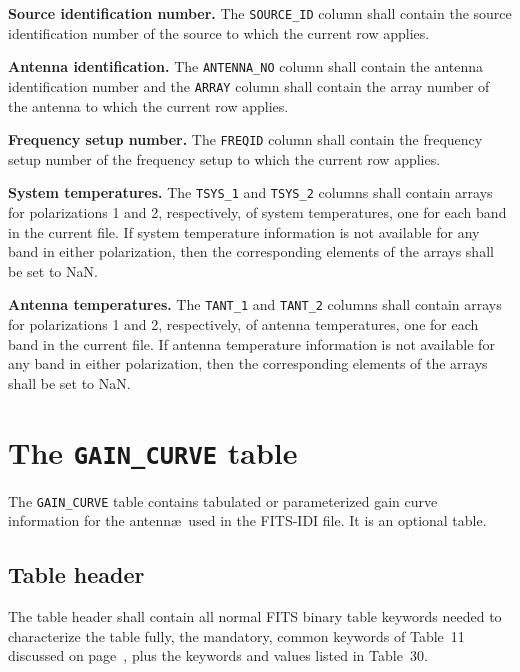 \documentclass[twoside]{article}
\newcommand{\Hi}[1]{\textcolor{hicol}{#1}}
\begin{document}
{\bf Source identification number.}  The {\tt SOURCE\_ID} column shall
contain the source identification number of the source to which the
current \Hi{row} applies.

{\bf Antenna identification.}  The {\tt ANTENNA\_NO} column shall
contain the antenna identification number and the {\tt ARRAY} column
shall contain the array number of the antenna to which the current row
applies.

{\bf Frequency setup number.}  The {\tt FREQID} column shall contain
the frequency setup number of the frequency setup to which the current
\Hi{row} applies.

{\bf System temperatures.}  The {\tt TSYS\_1} and {\tt TSYS\_2}
columns shall contain arrays \Hi{for polarizations 1 and 2,
  respectively,} of system temperatures\Hi{, one for each band in the
  current file.}  If system temperature information is not available
for any band in either polarization, then the corresponding elements
of the arrays shall be set to NaN\@.

{\bf Antenna temperatures.}  The {\tt TANT\_1} and {\tt TANT\_2}
columns shall contain arrays \Hi{for polarizations 1 and 2,
  respectively,} of antenna temperatures\Hi{, one for each band in the
  current file.}  If antenna temperature information is not available
for any band in either polarization, then the corresponding elements
of the arrays shall be set to NaN\@.

\section{The {\tt GAIN\_CURVE} table}
\label{s:GC}

The {\tt GAIN\_CURVE} table contains tabulated or parameterized gain
curve information for the antenn\ae\ used in the FITS-IDI file.  It is
an optional table.

\subsection{Table header}

\Hi{The table header shall contain all normal FITS binary table
keywords needed to characterize the table fully, the mandatory, common
keywords of Table~11 discussed on page~\pageref{ta:keywords}, plus the
keywords and values listed in Table~\Hi{30}.}
\end{document}
